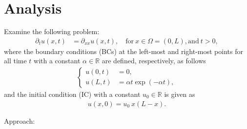 \documentclass[12pt]{article}
\begin{document}
\section{Analysis}
\begin{example}
	Examine the following problem:
	\begin{align}
		\label{eq:probleminh}
		\partial_t u(x,t) & = \partial_{xx} u(x,t), \quad \text{for} \ x \in \Omega = (0,L),\text{and}\ t>0,
	\end{align}
	where the boundary conditions (BCs) at the left-most and right-most points
	for all time $t$
	with a constant $\alpha \in \mathbb{R}$ are defined, respectively, as follows
	\begin{align}
		\begin{cases}
			u(0,t) & =0,                                                              \\
			u(L,t) & = \alpha t \exp(-\alpha t),                                     
		\end{cases}
	\end{align}
	and the initial condition (IC) with a constant $u_{0} \in \mathbb{R}$ is given as 
	\begin{align}
		u(x,0) = u_0 \ x(L-x).
	\end{align}
\end{example}
Approach:
\end{document}
